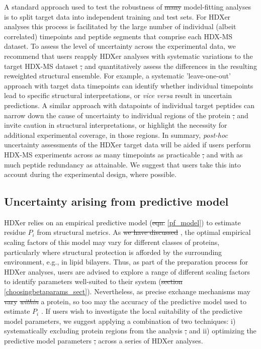 \documentclass[9pt,tutorial]{livecoms}
\providecommand{\DIFadd}[1]{{\protect\color{blue}\uwave{#1}}} %
\providecommand{\DIFdel}[1]{{\protect\color{red}\sout{#1}}}                      %
\providecommand{\DIFaddbegin}{} %
\providecommand{\DIFaddend}{} %
\providecommand{\DIFdelbegin}{} %
\providecommand{\DIFdelend}{} %
\begin{document}
A standard approach used to test the robustness of \DIFdelbegin \DIFdel{many }\DIFdelend model-fitting analyses is to split target data into independent training and test sets.
For HDXer analyses this process is facilitated by the large number of individual (albeit correlated) timepoints and peptide segments that comprise each HDX-MS dataset.
To assess the level of uncertainty across the experimental data, we recommend that users reapply HDXer analyses with systematic variations to the target HDX-MS dataset \DIFdelbegin \DIFdel{, }\DIFdelend and quantitatively assess the differences in the resulting reweighted structural ensemble. 
For example, a systematic 'leave-one-out' approach with target data timepoints can identify whether individual timepoints lead to specific structural interpretations, or \textit{vice versa} result in uncertain predictions.
A similar approach with datapoints of individual target peptides can narrow down the cause of uncertainty to individual regions of the protein \DIFdelbegin \DIFdel{, }\DIFdelend and invite caution in structural interpretations, or highlight the necessity for additional experimental coverage, in those regions.
In summary, \textit{post-hoc} uncertainty assessments of the HDXer target data will be aided if users perform HDX-MS experiments across as many timepoints as practicable \DIFdelbegin \DIFdel{, }\DIFdelend and with as much peptide redundancy as attainable.
We suggest that users take this into account during the experimental design, where possible.

\subsection{Uncertainty arising from \DIFaddbegin \DIFadd{the }\DIFaddend predictive model}
HDXer relies on an empirical predictive model (\DIFdelbegin \DIFdel{eqn. }\DIFdelend \DIFaddbegin \DIFadd{Equation }\DIFaddend \ref{pf_model}) to estimate residue $P_i$ from structural metrics.
As \DIFdelbegin \DIFdel{we have discussed }\DIFdelend \DIFaddbegin \DIFadd{discussed above}\DIFaddend , the optimal empirical scaling factors of this model may vary for different classes of proteins, particularly where structural protection is afforded by the surrounding environment, e.g., in lipid bilayers.
Thus, as part of the preparation process for HDXer analyses, users are advised to explore a range of different scaling factors to identify parameters well-suited to their system (\DIFdelbegin \DIFdel{section }\DIFdelend \DIFaddbegin \DIFadd{Section }\DIFaddend \ref{choosingbetaparams_sect}).
Nevertheless, as precise exchange mechanisms may \DIFdelbegin \DIFdel{vary }\textit{\DIFdel{within}} %
\DIFdelend \DIFaddbegin \DIFadd{even vary within }\DIFaddend a protein, so too may the accuracy of the predictive model used to estimate $P_i$ \cite{Skinner2012models, Mohammadiarani2018, McAllister2015}.
If users wish to investigate the local suitability of the predictive model parameters, we suggest applying a combination of two techniques: i) systematically excluding protein regions from the analysis \DIFdelbegin \DIFdel{, }\DIFdelend and ii) optimizing the predictive model parameters \DIFdelbegin \DIFdel{, }\DIFdelend across a series of HDXer analyses. 
\end{document}
